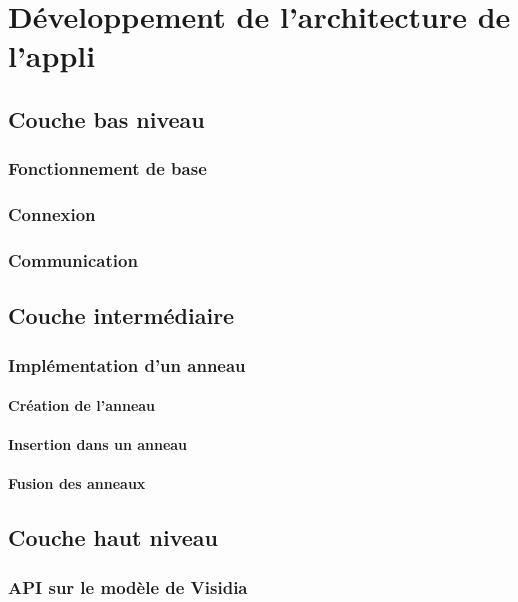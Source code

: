 \documentclass[a4paper,10pt]{report}
\begin{document}
\chapter{Développement de l'architecture de l'appli}
  \paragraph{}
  \section{Couche bas niveau}
    \subsection{Fonctionnement de base}
    \subsection{Connexion}
    \subsection{Communication}
  \section{Couche intermédiaire}
    \subsection{Implémentation d'un anneau}
      \subsubsection{Création de l'anneau}
      \subsubsection{Insertion dans un anneau}
      \subsubsection{Fusion des anneaux}
  \section{Couche haut niveau}
    \subsection{API sur le modèle de Visidia}
\end{document}
